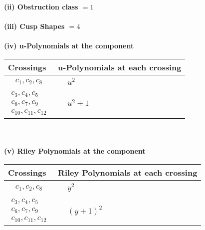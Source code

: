 \documentclass[1p]{elsarticle_modified}
\theoremstyle{definition}
\begin{document}
\flushleft \textbf{(ii) Obstruction class $= 1$}\\~\\
\flushleft \textbf{(iii) Cusp Shapes $= 4$}\\~\\
\newpage\renewcommand{\arraystretch}{1}
\flushleft \textbf{(iv) u-Polynomials at the component}\newline \\
\begin{tabular}{m{50pt}|m{274pt}}
Crossings & \hspace{64pt}u-Polynomials at each crossing \\
\hline $$\begin{aligned}c_{1},c_{2},c_{8}\end{aligned}$$&$\begin{aligned}
&u^2
\end{aligned}$\\
\hline $$\begin{aligned}c_{3},c_{4},c_{5}\\c_{6},c_{7},c_{9}\\c_{10},c_{11},c_{12}\end{aligned}$$&$\begin{aligned}
&u^2+1
\end{aligned}$\\
\hline
\end{tabular}\\~\\
\newpage\renewcommand{\arraystretch}{1}
\flushleft \textbf{(v) Riley Polynomials at the component}\newline \\
\begin{tabular}{m{50pt}|m{274pt}}
Crossings & \hspace{64pt}Riley Polynomials at each crossing \\
\hline $$\begin{aligned}c_{1},c_{2},c_{8}\end{aligned}$$&$\begin{aligned}
&y^2
\end{aligned}$\\
\hline $$\begin{aligned}c_{3},c_{4},c_{5}\\c_{6},c_{7},c_{9}\\c_{10},c_{11},c_{12}\end{aligned}$$&$\begin{aligned}
&(y+1)^2
\end{aligned}$\\
\hline
\end{tabular}\\~\\
\end{document}
